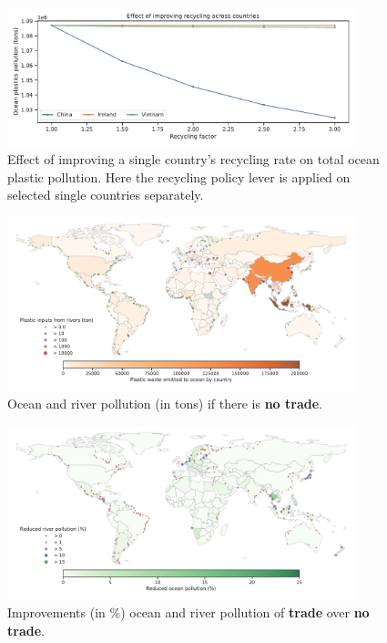 \documentclass[dvipsnames]{article}
\begin{document}
\begin{figure}[htb!] 
	\centering
		\includegraphics[width=0.9\textwidth]{figures/Countrywise.pdf}
	\caption{\small Effect of improving a single country's recycling rate on total ocean plastic pollution. Here the recycling policy lever is applied on selected single countries separately.}
	\label{fig:countrywise recycling policy}
\end{figure}

\begin{figure}[htb!] 
	\centering
		\includegraphics[width=0.9\textwidth]{figures/base.pdf}
	\caption{\small Ocean and river pollution (in tons) if there is \textbf{no trade}.}
	\label{fig:base}
\end{figure}

\begin{figure}[htb!] 
	\centering
		\includegraphics[width=0.9\textwidth]{improvement_w1_per.pdf}
	\caption{\small Improvements (in \%) ocean and river pollution of \textbf{trade} over \textbf{no trade}.}
	\label{fig:improvement_w1_per}
\end{figure}
\end{document}

